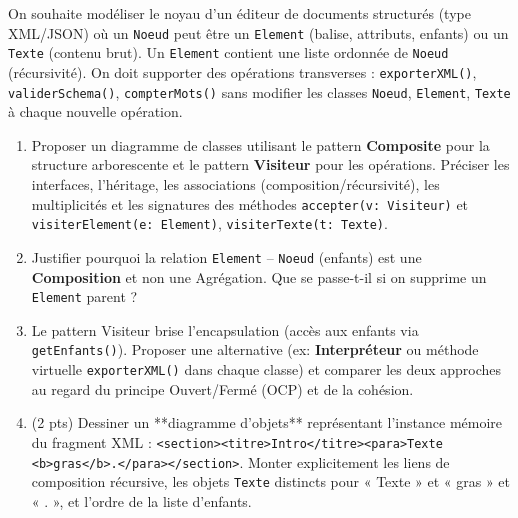 \documentclass[11pt]{article}
\begin{document}
\begin{exercice}
On souhaite modéliser le noyau d'un éditeur de documents structurés (type XML/JSON) où un \texttt{Noeud} peut être un \texttt{Element} (balise, attributs, enfants) ou un \texttt{Texte} (contenu brut). Un \texttt{Element} contient une liste ordonnée de \texttt{Noeud} (récursivité). On doit supporter des opérations transverses : \texttt{exporterXML()}, \texttt{validerSchema()}, \texttt{compterMots()} sans modifier les classes \texttt{Noeud}, \texttt{Element}, \texttt{Texte} à chaque nouvelle opération.
\begin{enumerate}
    \item Proposer un diagramme de classes utilisant le pattern \textbf{Composite} pour la structure arborescente et le pattern \textbf{Visiteur} pour les opérations. Préciser les interfaces, l'héritage, les associations (composition/récursivité), les multiplicités et les signatures des méthodes \texttt{accepter(v: Visiteur)} et \texttt{visiterElement(e: Element)}, \texttt{visiterTexte(t: Texte)}.
    \item Justifier pourquoi la relation \texttt{Element} -- \texttt{Noeud} (enfants) est une \textbf{Composition} et non une Agrégation. Que se passe-t-il si on supprime un \texttt{Element} parent ?
    \item Le pattern Visiteur brise l'encapsulation (accès aux enfants via \texttt{getEnfants()}). Proposer une alternative (ex: \textbf{Interpréteur} ou méthode virtuelle \texttt{exporterXML()} dans chaque classe) et comparer les deux approches au regard du principe Ouvert/Fermé (OCP) et de la cohésion.
    \item (2 pts) Dessiner un **diagramme d'objets** représentant l'instance mémoire du fragment XML : \texttt{<section><titre>Intro</titre><para>Texte <b>gras</b>.</para></section>}. Monter explicitement les liens de composition récursive, les objets \texttt{Texte} distincts pour « Texte » et « gras » et « . », et l'ordre de la liste d'enfants.
\end{enumerate}
\end{exercice}
\end{document}
